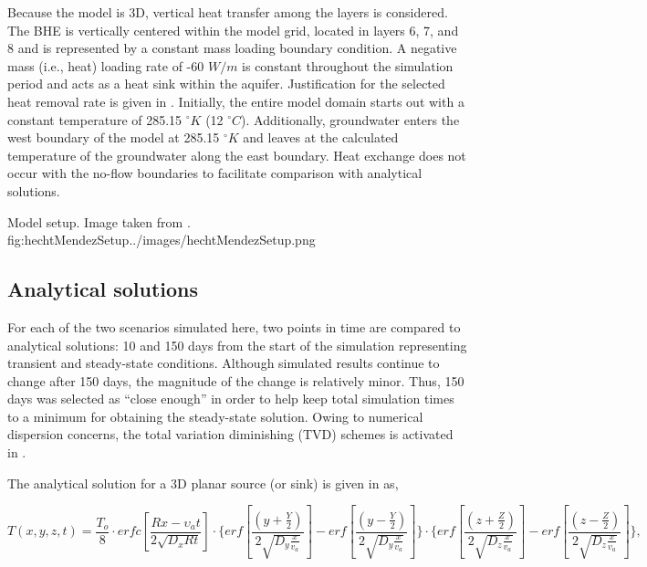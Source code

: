 Because the model is 3D, vertical heat transfer among the layers is considered.  The BHE is vertically centered within the model grid, located in layers 6, 7, and 8 and is represented by a constant mass loading boundary condition.  A negative mass (i.e., heat) loading rate of -60 $W/m$ is constant throughout the simulation period and acts as a heat sink within the aquifer.  Justification for the selected heat removal rate is given in \cite{hechtMendez2010}.  Initially, the entire model domain starts out with a constant temperature of 285.15 $^{\circ}K$ (12 $^{\circ}C$).  Additionally, groundwater enters the west boundary of the model at 285.15 $^{\circ}K$ and leaves at the calculated temperature of the groundwater along the east boundary.  Heat exchange does not occur with the no-flow boundaries to facilitate comparison with analytical solutions.

\begin{StandardFigure}{
                                     Model setup.  Image taken from \cite{hechtMendez2010}.
                                     }{fig:hechtMendezSetup}{../images/hechtMendezSetup.png}
\end{StandardFigure}

\subsection{Analytical solutions}

For each of the two scenarios simulated here, two points in time are compared to analytical solutions: 10 and 150 days from the start of the simulation representing transient and steady-state conditions.  Although simulated results continue to change after 150 days, the magnitude of the change is relatively minor.  Thus, 150 days was selected as ``close enough'' in order to help keep total simulation times to a minimum for obtaining the steady-state solution.  Owing to numerical dispersion concerns, the total variation diminishing (TVD) schemes is activated in \mf.

The analytical solution for a 3D planar source (or sink) is given in \citep{domenico1985} as,

\begin{equation}
	T \left( x, y, z, t \right) = \frac{T_o}{8} \cdot erfc \left[ \frac{Rx - \upsilon_a t}{2 \sqrt{D_x R t}} \right] \cdot \Bigg\{ erf \left[ \frac{ \left( y + \frac{Y}{2} \right)}{2 \sqrt{D_y \frac{x}{v_a}}} \right] -  erf \left[ \frac{ \left( y - \frac{Y}{2} \right)}{2 \sqrt{D_y \frac{x}{v_a}}} \right] \Bigg\} \cdot \Bigg\{ erf \left[ \frac{ \left( z + \frac{Z}{2} \right)}{2 \sqrt{D_z \frac{x}{v_a}}} \right] -  erf \left[ \frac{ \left( z - \frac{Z}{2} \right)}{2 \sqrt{D_z \frac{x}{v_a}}} \right] \Bigg\},
	\label{eq:hm3}
\end{equation}

